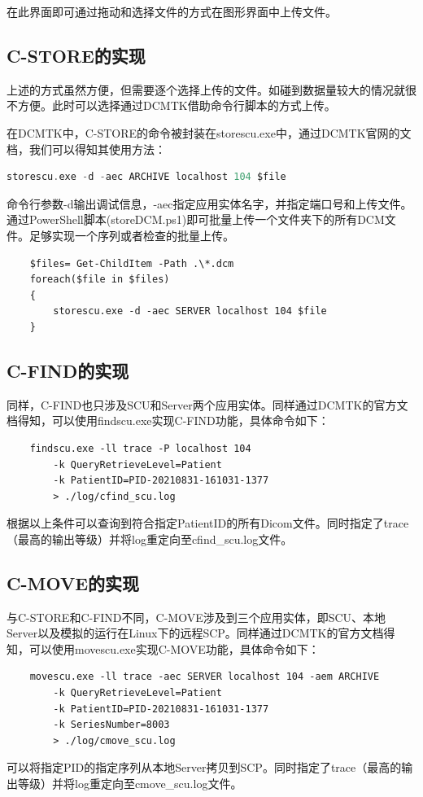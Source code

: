 \documentclass[UTF8]{ctexart}
\begin{document}
在此界面即可通过拖动和选择文件的方式在图形界面中上传文件。

\subsection{C-STORE的实现}
上述的方式虽然方便，但需要逐个选择上传的文件。如碰到数据量较大的情况就很不方便。此时可以选择通过DCMTK借助命令行脚本的方式上传。

在DCMTK中，C-STORE的命令被封装在storescu.exe中，通过DCMTK官网的文档，我们可以得知其使用方法\cite{DCMTK}：
\begin{lstlisting}[language=C]
    storescu.exe -d -aec ARCHIVE localhost 104 $file
\end{lstlisting}
命令行参数-d输出调试信息，-aec指定应用实体名字，并指定端口号和上传文件。通过PowerShell脚本(storeDCM.ps1)即可批量上传一个文件夹下的所有DCM文件。足够实现一个序列或者检查的批量上传。
\begin{lstlisting}
    $files= Get-ChildItem -Path .\*.dcm 
    foreach($file in $files)
    {
        storescu.exe -d -aec SERVER localhost 104 $file
    }
\end{lstlisting}

\subsection{C-FIND的实现}
同样，C-FIND也只涉及SCU和Server两个应用实体。同样通过DCMTK的官方文档得知，可以使用findscu.exe实现C-FIND功能，具体命令如下：
\begin{lstlisting}
    findscu.exe -ll trace -P localhost 104 
        -k QueryRetrieveLevel=Patient 
        -k PatientID=PID-20210831-161031-1377 
        > ./log/cfind_scu.log
\end{lstlisting}
根据以上条件可以查询到符合指定PatientID的所有Dicom文件。同时指定了trace（最高的输出等级）并将log重定向至cfind\_scu.log文件。

\subsection{C-MOVE的实现}
与C-STORE和C-FIND不同，C-MOVE涉及到三个应用实体，即SCU、本地Server以及模拟的运行在Linux下的远程SCP。同样通过DCMTK的官方文档得知，可以使用movescu.exe实现C-MOVE功能，具体命令如下：
\begin{lstlisting}
    movescu.exe -ll trace -aec SERVER localhost 104 -aem ARCHIVE 
        -k QueryRetrieveLevel=Patient 
        -k PatientID=PID-20210831-161031-1377 
        -k SeriesNumber=8003
        > ./log/cmove_scu.log
\end{lstlisting}
可以将指定PID的指定序列从本地Server拷贝到SCP。同时指定了trace（最高的输出等级）并将log重定向至cmove\_scu.log文件。
\end{document}
